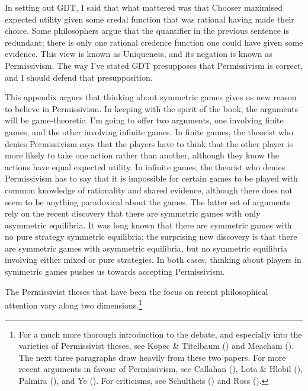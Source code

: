\documentclass[
  12pt,
  letterpaper,
  DIV=11,
  numbers=noendperiod]{scrreprt}
\begin{document}
In setting out GDT, I said that what mattered was that Chooser maximised
expected utility given some credal function that was rational having
made their choice. Some philosophers argue that the quantifier in the
previous sentence is redundant; there is only one rational credence
function one could have given some evidence. This view is known as
Uniqueness, and its negation is known as Permissivism. The way I've
stated GDT presupposes that Permissivism is correct, and I should defend
that presupposition.

This appendix argues that thinking about symmetric games gives us new
reason to believe in Permissivism. In keeping with the spirit of the
book, the arguments will be game-theoretic. I'm going to offer two
arguments, one involving finite games, and the other involving infinite
games. In finite games, the theorist who denies Permissivism says that
the players have to think that the other player is more likely to take
one action rather than another, although they know the actions have
equal expected utility. In infinite games, the theorist who denies
Permissivism has to say that it is impossible for certain games to be
played with common knowledge of rationality and shared evidence,
although there does not seem to be anything paradoxical about the games.
The latter set of arguments rely on the recent discovery that there are
symmetric games with only asymmetric equilibria. It was long known that
there are symmetric games with no pure strategy symmetric equilibria;
the surprising new discovery is that there are symmetric games with
asymmetric equilibria, but no symmetric equilibria involving either
mixed or pure strategies. In both cases, thinking about players in
symmetric games pushes us towards accepting Permissivism.

The Permissivist theses that have been the focus on recent philosophical
attention vary along two dimensions.\footnote{For a much more thorough
  introduction to the debate, and especially into the varieties of
  Permissivist theses, see Kopec \& Titelbaum
  () and Meacham
  (). The next three paragraphs draw
  heavily from these two papers. For more recent arguments in favour of
  Permissivism, see Callahan (), Lota
  \& Hlobil (), Palmira
  (), and Ye
  (). For criticisms, see Schultheis
  () and Ross
  ().}
\end{document}
